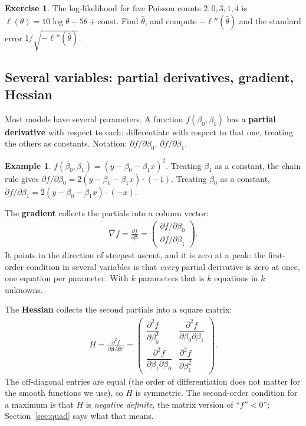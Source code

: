 \documentclass[11pt]{article}
\theoremstyle{definition}
\newtheorem{example}{Example}[section]
\newtheorem{exercise}{Exercise}
\newcommand{\loglik}{\ell}
\newcommand{\bbeta}{\bm{\beta}}
\begin{document}
\begin{exercise}
The log-likelihood for five Poisson counts $2, 0, 3, 1, 4$ is
$\loglik(\theta) = 10\log\theta - 5\theta + \text{const}$. Find
$\hat\theta$, and compute $-\loglik''(\hat\theta)$ and the standard error
$1/\sqrt{-\loglik''(\hat\theta)}$.
\end{exercise}

\subsection{Several variables: partial derivatives, gradient, Hessian}
\label{sec:partial}

Most models have several parameters. A function $f(\beta_0, \beta_1)$ has a
\textbf{partial derivative} with respect to each: differentiate with
respect to that one, treating the others as constants. Notation:
$\partial f/\partial\beta_0$, $\partial f/\partial\beta_1$.

\begin{example}
$f(\beta_0, \beta_1) = (y - \beta_0 - \beta_1 x)^2$. Treating $\beta_1$ as
a constant, the chain rule gives
$\partial f/\partial\beta_0 = 2(y - \beta_0 - \beta_1 x)\cdot(-1)$.
Treating $\beta_0$ as a constant,
$\partial f/\partial\beta_1 = 2(y - \beta_0 - \beta_1 x)\cdot(-x)$.
\end{example}

The \textbf{gradient} collects the partials into a column vector:
\begin{align*}
  \nabla f = \frac{\partial f}{\partial\bbeta} =
  \begin{pmatrix} \partial f/\partial\beta_0 \\ \partial f/\partial\beta_1 \end{pmatrix}.
\end{align*}
It points in the direction of steepest ascent, and it is zero at a peak:
the first-order condition in several variables is that \emph{every} partial
derivative is zero at once, one equation per parameter. With $k$ parameters
that is $k$ equations in $k$ unknowns.

The \textbf{Hessian} collects the second partials into a square matrix:
\begin{align*}
  H = \frac{\partial^2 f}{\partial\bbeta\,\partial\bbeta'} =
  \begin{pmatrix}
    \dfrac{\partial^2 f}{\partial\beta_0^2} & \dfrac{\partial^2 f}{\partial\beta_0\partial\beta_1} \\[8pt]
    \dfrac{\partial^2 f}{\partial\beta_1\partial\beta_0} & \dfrac{\partial^2 f}{\partial\beta_1^2}
  \end{pmatrix}.
\end{align*}
The off-diagonal entries are equal (the order of differentiation does not
matter for the smooth functions we use), so $H$ is symmetric. The
second-order condition for a maximum is that $H$ is \emph{negative
definite}, the matrix version of ``$f'' < 0$''; Section~\ref{sec:quad}
says what that means.
\end{document}
